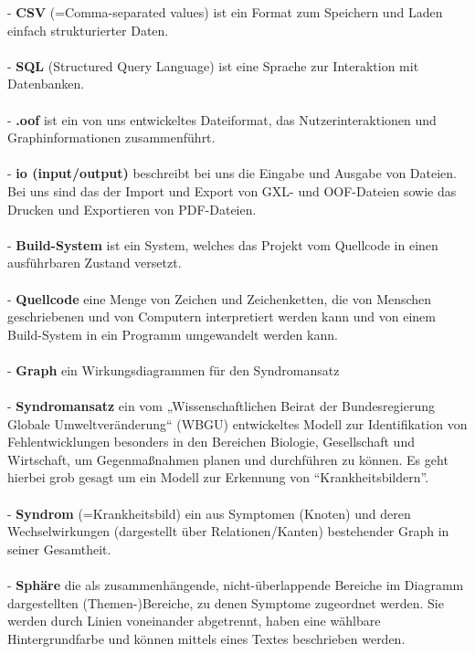 \documentclass[enabledeprecatedfontcommands,fontsize=11pt,paper=a4,twoside]{scrartcl}
\newcounter{one}
\begin{document}
- \textbf{CSV} (=Comma-separated values) ist ein Format zum Speichern und Laden einfach strukturierter Daten.\\ \\
- \textbf{SQL} (Structured Query Language) ist eine Sprache zur Interaktion mit Datenbanken. \\ \\
- \textbf{.oof} ist ein von uns entwickeltes Dateiformat, das Nutzerinteraktionen und Graphinformationen zusammenführt. \\ \\
- \textbf{io (input/output)} beschreibt bei uns die Eingabe und Ausgabe von Dateien. Bei uns sind das der Import und Export von GXL- und OOF-Dateien sowie das Drucken und Exportieren von PDF-Dateien. \\ \\
- \textbf{Build-System} ist ein System, welches das Projekt vom Quellcode in einen ausführbaren Zustand versetzt. \\ \\
- \textbf{Quellcode} eine Menge von Zeichen und Zeichenketten, die von Menschen geschriebenen und von Computern interpretiert werden kann und von einem Build-System in ein Programm umgewandelt werden kann.  \\ \\
- \textbf{Graph} ein Wirkungsdiagrammen für den Syndromansatz  \\ \\
- \textbf{\hypertarget{Syndromansatz}{Syndromansatz}} ein vom „Wissenschaftlichen Beirat der Bundesregierung Globale Umweltveränderung“ (WBGU) entwickeltes Modell zur Identifikation von Fehlentwicklungen besonders in den Bereichen Biologie, Gesellschaft und Wirtschaft, um Gegenmaßnahmen planen und durchführen zu können. Es geht hierbei grob gesagt um ein Modell zur Erkennung von ``Krankheitsbildern''. \\ \\
- \textbf{Syndrom} (=Krankheitsbild) ein aus Symptomen (Knoten) und deren Wechselwirkungen (dargestellt über Relationen/Kanten) bestehender Graph in seiner Gesamtheit. \\ \\
- \textbf{\hypertarget{Sphäre}{Sphäre}} die als zusammenhängende, nicht-überlappende Bereiche im Diagramm dargestellten (Themen-)Bereiche, zu denen  Symptome zugeordnet werden. Sie werden durch Linien voneinander abgetrennt, haben eine wählbare Hintergrundfarbe und können mittels eines Textes beschrieben werden. \\ \\
\end{document}

